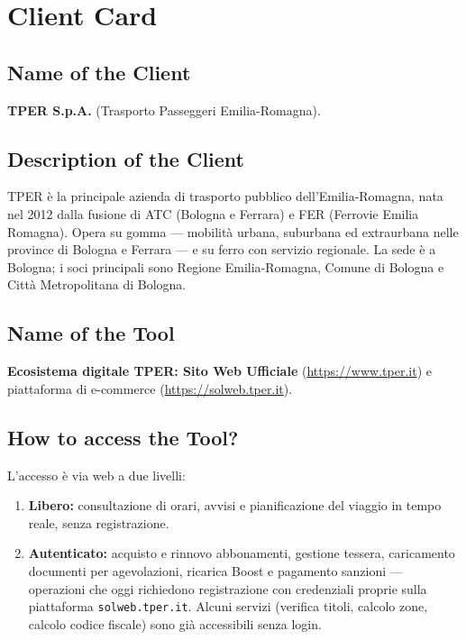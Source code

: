 ﻿\documentclass[11pt,a4paper]{article}
\begin{document}
\vspace{0.4cm}

\section{Client Card}

\subsection{Name of the Client}
\textbf{TPER S.p.A.} (Trasporto Passeggeri Emilia-Romagna).

\subsection{Description of the Client}
TPER è la principale azienda di trasporto pubblico dell'Emilia-Romagna,
nata nel 2012 dalla fusione di ATC (Bologna e Ferrara) e FER (Ferrovie
Emilia Romagna). Opera su gomma --- mobilità urbana, suburbana ed extraurbana
nelle province di Bologna e Ferrara --- e su ferro con servizio regionale.
La sede è a Bologna; i soci principali sono Regione Emilia-Romagna, Comune
di Bologna e Città Metropolitana di Bologna.

\subsection{Name of the Tool}
\textbf{Ecosistema digitale TPER: Sito Web Ufficiale}
(\url{https://www.tper.it}) e piattaforma di e-commerce
(\url{https://solweb.tper.it}).

\subsection{How to access the Tool?}
L'accesso è via web a due livelli:
\begin{enumerate}[leftmargin=*]
    \item \textbf{Libero:} consultazione di orari, avvisi e pianificazione
    del viaggio in tempo reale, senza registrazione.
    \item \textbf{Autenticato:} acquisto e rinnovo abbonamenti, gestione
    tessera, caricamento documenti per agevolazioni, ricarica Boost e
    pagamento sanzioni --- operazioni che oggi richiedono registrazione
    con credenziali proprie sulla piattaforma \texttt{solweb.tper.it}.
    Alcuni servizi (verifica titoli, calcolo zone, calcolo codice
    fiscale) sono già accessibili senza login.
\end{enumerate}
\end{document}
